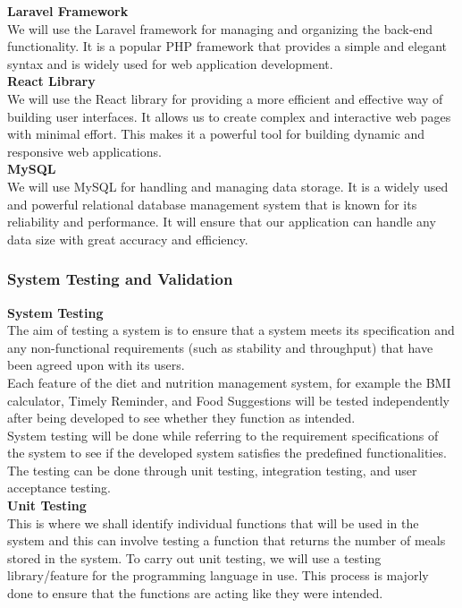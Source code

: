 \documentclass {article}
\begin{document}
\noindent \textbf{Laravel Framework\\}
\noindent We will use the Laravel framework for managing and organizing the back-end functionality. It is a popular PHP framework that provides a simple and elegant syntax and is widely used for web application development.\\

\noindent \textbf{React Library\\}
\noindent We will use the React library for providing a more efficient and effective way of building user interfaces. It allows us to create complex and interactive web pages with minimal effort. This makes it a powerful tool for building dynamic and responsive web applications.\\

\noindent \textbf{MySQL\\}
We will use MySQL for handling and managing data storage. It is a widely used and powerful relational database management system that is known for its reliability and performance. It will ensure that our application can handle any data size with great accuracy and efficiency.


\subsubsection{System Testing and Validation}
\noindent \textbf{System Testing \\}
\noindent The aim of testing a system is to ensure that a system meets its specification and any non-functional requirements (such as stability and throughput) that have been agreed upon with its users.\\

\noindent Each feature of the diet and nutrition management system, for example the BMI calculator, Timely Reminder, and Food Suggestions will be tested independently after being developed to see whether they function as intended.\\

\noindent System testing will be done while referring to the requirement specifications of the system to see if the developed system satisfies the predefined functionalities. The testing can be done through unit testing, integration testing, and user acceptance testing. \\

\noindent \textbf{Unit Testing \\}
\noindent This is where we shall identify individual functions that will be used in the system and this can involve testing a function that returns the number of meals stored in the system. To carry out unit testing, we will use a testing library/feature for the programming language in use. This process is majorly done to ensure that the functions are acting like they were intended. \\
\end{document}
